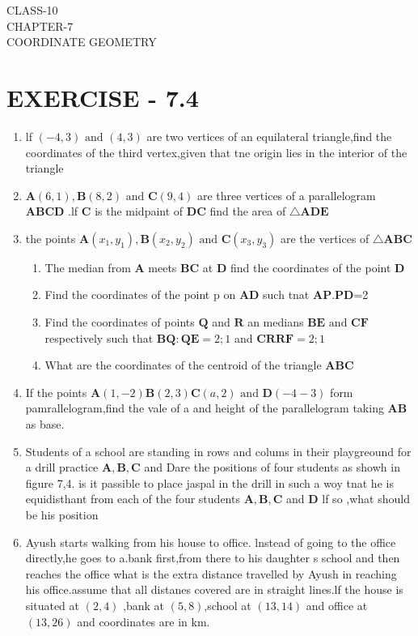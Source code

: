 \documentclass[12pt]{article}
\let\vec\mathbf
\begin{document}
\begin{center}
\textbf\large{CLASS-10\\CHAPTER-7 \\ COORDINATE GEOMETRY}
\end{center}

\section*{EXERCISE - 7.4}

\begin{enumerate}
\item lf $(-4,3)\text{ and }(4,3)$ are two vertices of an equilateral triangle,find the coordinates of the third vertex,given that tne origin lies in the interior of the triangle 
\item $\vec{A} (6,1),\vec{B}(8,2) \text{ and } \vec{C}(9,4)$ are three vertices of a parallelogram $\vec{ABCD}$ .lf $\vec{C}$ is the midpaint of $\vec{DC}$ find the area of $\triangle \vec{ADE}$
\item the points $\vec{A} (x_1,y_1),\vec{B}(x_2,y_2)\text{ and } \vec{C} (x_3,y_3) $ are the vertices of $\triangle\vec{ABC}$
	\begin{enumerate}	
		\item The median from $\vec{A}$ meets $\vec{BC}$ at $\vec{D}$ find the coordinates of the point $\vec{D}$
		\item Find the coordinates of the point p  on $\vec{AD}$ such tnat $\vec{AP}.\vec{PD}$=2
\item Find the coordinates of points $\vec{Q}$ and $\vec{R}$ an medians $\vec{BE}\text{ and }\vec{CF}$respectively such that $\vec{BQ}:\vec{QE}=2;1$ and $\vec{CR}\vec{RF}=2;1$
\item What are the coordinates of the centroid of the triangle $\vec{ABC}$
	\end{enumerate}
\item If the points  $\vec{A} (1,-2) \vec{B}(2,3) \vec{C}(a,2)\text{ and }\vec{D} (-4-3)$ form pamrallelogram,find the vale of a and height of the parallelogram taking $\vec{AB}$ as base.
\item Students of a school are standing in rows and colums in their playgreound for a drill practice $\vec{A,B,C}$ and Dare the positions of four students as showh in figure 7,4. is it passible to place jaspal in the drill in such a woy tnat he is equidisthant from each of the four students $\vec{ A,B,C}$ and $\vec{D}$ lf so ,what should be his position 
\item Ayush starts walking from his house to office. lnstead of going to the office directly,he goes to a.bank first,from there to his daughter s school and then reaches the office what is the extra distance travelled by Ayush in reaching his office.assume that all distanes covered are in straight lines.lf the house is situated at $(2,4)$ ,bank at $(5,8)$,school at $(13,14)$ and office at $(13,26)$ and coordinates are in km.


\end{enumerate}
\end{document}
